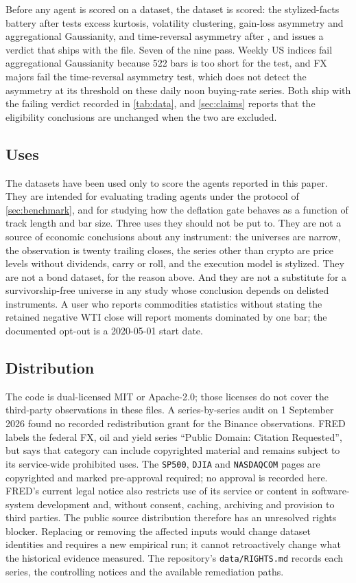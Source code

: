 Before any agent is scored on a dataset, the dataset is scored: the stylized-facts battery after \citet{cont2001empirical} tests excess kurtosis, volatility clustering, gain-loss asymmetry and aggregational Gaussianity, and time-reversal asymmetry after \citet{zumbach2009time}, and issues a verdict that ships with the file. Seven of the nine pass. Weekly US indices fail aggregational Gaussianity because 522 bars is too short for the test, and FX majors fail the time-reversal asymmetry test, which does not detect the asymmetry at its threshold on these daily noon buying-rate series. Both ship with the failing verdict recorded in \cref{tab:data}, and \cref{sec:claims} reports that the eligibility conclusions are unchanged when the two are excluded.

\subsection{Uses}

The datasets have been used only to score the agents reported in this paper. They are intended for evaluating trading agents under the protocol of \cref{sec:benchmark}, and for studying how the deflation gate behaves as a function of track length and bar size. Three uses they should not be put to. They are not a source of economic conclusions about any instrument: the universes are narrow, the observation is twenty trailing closes, the series other than crypto are price levels without dividends, carry or roll, and the execution model is stylized. They are not a bond dataset, for the reason above. And they are not a substitute for a survivorship-free universe in any study whose conclusion depends on delisted instruments. A user who reports commodities statistics without stating the retained negative WTI close will report moments dominated by one bar; the documented opt-out is a 2020-05-01 start date.

\subsection{Distribution}

The code is dual-licensed MIT or Apache-2.0; those licenses do not cover the third-party observations in these files. A series-by-series audit on 1 September 2026 found no recorded redistribution grant for the Binance observations. FRED labels the federal FX, oil and yield series ``Public Domain: Citation Requested'', but says that category can include copyrighted material and remains subject to its service-wide prohibited uses. The \texttt{SP500}, \texttt{DJIA} and \texttt{NASDAQCOM} pages are copyrighted and marked pre-approval required; no approval is recorded here. FRED's current legal notice also restricts use of its service or content in software-system development and, without consent, caching, archiving and provision to third parties. The public source distribution therefore has an unresolved rights blocker. Replacing or removing the affected inputs would change dataset identities and requires a new empirical run; it cannot retroactively change what the historical evidence measured. The repository's \texttt{data/RIGHTS.md} records each series, the controlling notices and the available remediation paths.

